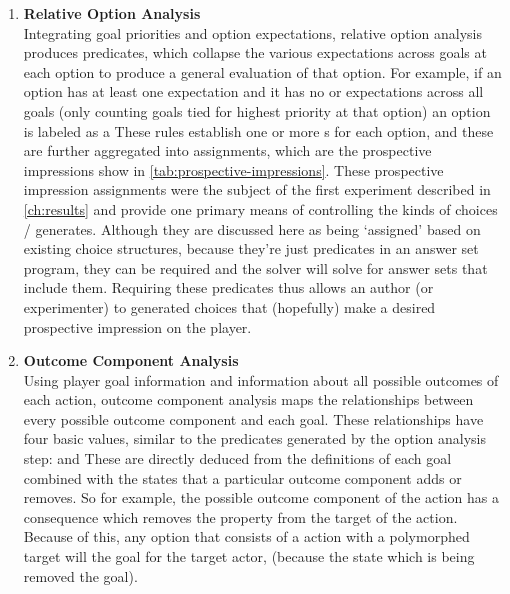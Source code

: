 \begin{enumerate}
  \item %
    \textbf{Relative Option Analysis} \\
    Integrating goal priorities and option expectations, relative option analysis produces  predicates, which collapse the various expectations across goals at each option to produce a general evaluation of that option.
    For example, if an option has at least one  expectation and it has no  or  expectations across all goals (only counting goals tied for highest priority at that option) an option is labeled as a 
    These rules establish one or more s for each option, and these are further aggregated into  assignments, which are the prospective impressions show in \cref{tab:prospective-impressions}.
    These prospective impression assignments were the subject of the first experiment described in \cref{ch:results} and provide one primary means of controlling the kinds of choices \dunyazad/ generates.
    Although they are discussed here as being `assigned' based on existing choice structures, because they're just predicates in an answer set program, they can be required and the solver will solve for answer sets that include them.
    Requiring these  predicates thus allows an author (or experimenter) to generated choices that (hopefully) make a desired prospective impression on the player.

  \item %
    \textbf{Outcome Component Analysis} \\
    Using player goal information and information about all possible outcomes of each action, outcome component analysis maps the relationships between every possible outcome component and each goal.
  These relationships have four basic values, similar to the  predicates generated by the option analysis step:    and 
    These are directly deduced from the definitions of each goal combined with the states that a particular outcome component adds or removes.
    So for example, the  possible outcome component of the  action has a consequence which removes the  property from the target of the action.
    Because of this, any option that consists of a  action with a polymorphed target will  the  goal for the target actor, (because the  state which is being removed  the  goal).


\end{enumerate}
